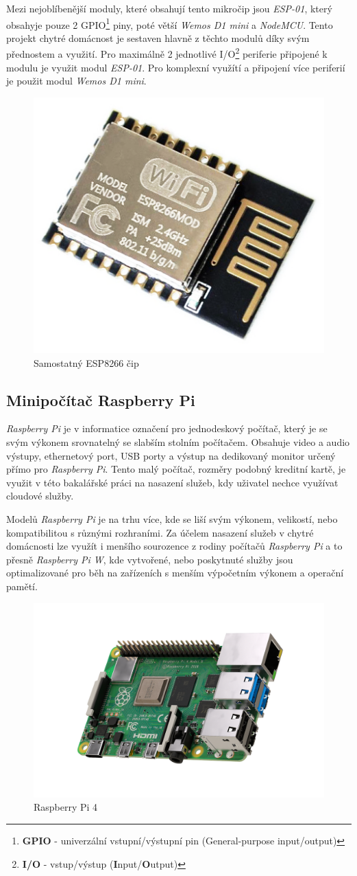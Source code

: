 Mezi nejoblíbenější moduly, které obsahují tento mikročip jsou \emph{ESP-01}, který obsahyje pouze 2 GPIO\footnote{\textbf{GPIO} - univerzální vstupní/výstupní pin (General-purpose input/output)} piny, poté větší \emph{Wemos D1 mini} a \emph{NodeMCU}.
Tento projekt chytré domácnost je sestaven hlavně z těchto modulů díky svým přednostem a využití.
Pro maximálně 2 jednotlivé I/O\footnote{\textbf{I/O} - vstup/výstup (\textbf{I}nput/\textbf{O}utput)} periferie připojené k modulu je využit modul \emph{ESP-01}.
Pro komplexní využítí a připojení více periferií je použit modul \emph{Wemos D1 mini}.

\begin{figure}[hbt]
  \centering
  \includegraphics[width=.2 \linewidth]{obrazky-figures/esp_standalone.png}
  \caption{Samostatný ESP8266 čip}
  \label{figure:esp8266}
\end{figure}

\subsection*{Minipočítač Raspberry Pi}
\label{terminy:raspberry}

\emph{Raspberry Pi} je v informatice označení pro jednodeskový počítač, který je se svým výkonem srovnatelný se slabším stolním počítačem.
Obsahuje video a audio výstupy,
ethernetový port, USB porty a výstup na dedikovaný monitor určený přímo pro \emph{Raspberry Pi}.
Tento malý počítač, rozměry podobný kreditní kartě, je využit v této bakalářské práci na nasazení služeb, kdy uživatel nechce využívat cloudové služby.

Modelů \emph{Raspberry Pi} je na trhu více, kde se liší svým výkonem, velikostí, nebo kompatibilitou s různými rozhraními.
Za účelem nasazení služeb v chytré domácnosti lze využít i menšího sourozence z rodiny počítačů \emph{Raspberry Pi} a to přesně \emph{Raspberry Pi W},
kde vytvořené, nebo poskytnuté služby jsou optimalizované pro běh na zařízeních s menším výpočetním výkonem a operační pamětí.

\begin{figure}[ht]
  \centering
  \includegraphics[width=.5 \linewidth]{obrazky-figures/raspberry.png}
  \caption{Raspberry Pi 4}
\end{figure}

